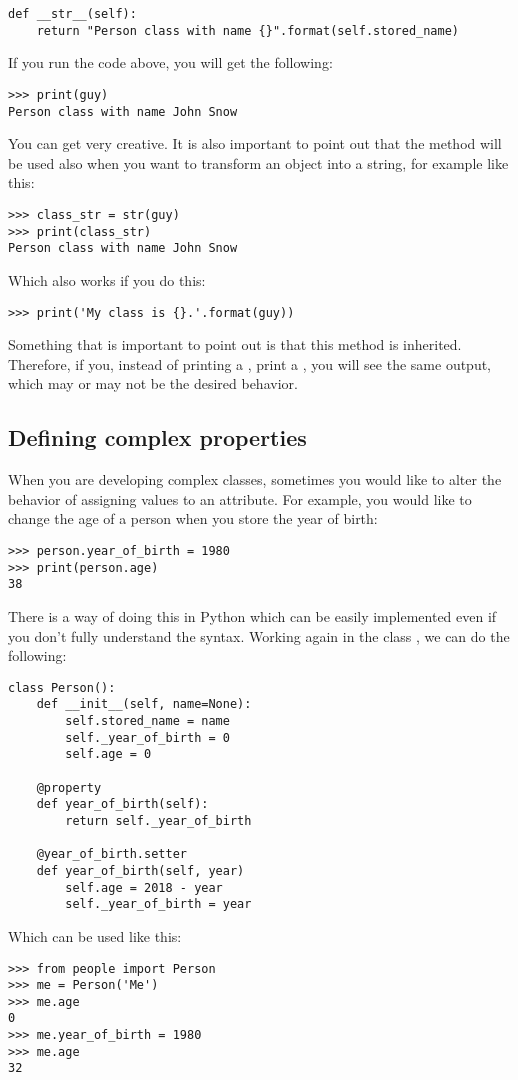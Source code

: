 \begin{verbatim}
def __str__(self):
    return "Person class with name {}".format(self.stored_name)
\end{verbatim}

If you run the code above, you will get the following:
\begin{verbatim}
>>> print(guy)
Person class with name John Snow
\end{verbatim}

You can get very creative. It is also important to point out that the method  will be used also when you want to transform an object into a string, for example like this:

\begin{verbatim}
>>> class_str = str(guy)
>>> print(class_str)
Person class with name John Snow
\end{verbatim}

Which also works if you do this:

\begin{verbatim}
>>> print('My class is {}.'.format(guy))
\end{verbatim}

Something that is important to point out is that this method is inherited. Therefore, if you, instead of printing a , print a , you will see the same output, which may or may not be the desired behavior.

\subsection{Defining complex properties}
When you are developing complex classes, sometimes you would like to alter the behavior of assigning values to an attribute. For example, you would like to change the age of a person when you store the year of birth:
\begin{verbatim}
>>> person.year_of_birth = 1980
>>> print(person.age)
38
\end{verbatim}

There is a way of doing this in Python which can be easily implemented even if you don't fully understand the syntax. Working again in the class , we can do the following:
\begin{verbatim}
class Person():
    def __init__(self, name=None):
        self.stored_name = name
        self._year_of_birth = 0
        self.age = 0

    @property
    def year_of_birth(self):
        return self._year_of_birth
        
    @year_of_birth.setter
    def year_of_birth(self, year)
        self.age = 2018 - year
        self._year_of_birth = year
\end{verbatim}
Which can be used like this:
\begin{verbatim}
>>> from people import Person
>>> me = Person('Me')
>>> me.age
0
>>> me.year_of_birth = 1980
>>> me.age
32
\end{verbatim}

